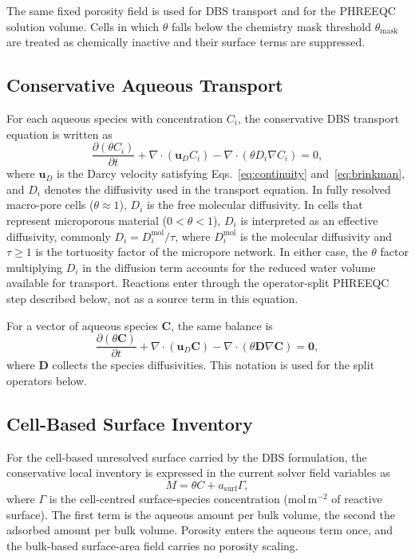 The same fixed porosity field is used for DBS transport and for the PHREEQC
solution volume. Cells in
which $\theta$ falls below the chemistry mask threshold
$\theta_{\mathrm{mask}}$ are treated as chemically inactive and their surface
terms are suppressed.

\subsection{Conservative Aqueous Transport}

For each aqueous species with concentration $C_i$, the conservative DBS
transport equation is written as
\begin{equation}
\frac{\partial (\theta C_i)}{\partial t}
+ \nabla \cdot (\bm{u}_D C_i)
- \nabla \cdot (\theta D_i \nabla C_i) = 0,
\end{equation}
where $\bm{u}_D$ is the Darcy velocity satisfying
Eqs.~\eqref{eq:continuity} and~\eqref{eq:brinkman}, and $D_i$ denotes the
diffusivity used in the transport equation. In fully resolved macro-pore cells
($\theta \approx 1$), $D_i$ is the free molecular diffusivity. In cells that
represent microporous material ($0 < \theta < 1$), $D_i$ is interpreted as an
effective diffusivity, commonly $D_i = D_i^{\mathrm{mol}}/\tau$, where
$D_i^{\mathrm{mol}}$ is the molecular diffusivity and $\tau \geq 1$ is the
tortuosity factor of the micropore network. In either case, the $\theta$ factor
multiplying $D_i$ in the diffusion term accounts for the reduced water volume
available for transport. Reactions enter through the operator-split PHREEQC
step described below, not as a source term in this equation.

For a vector of aqueous species $\bm{C}$, the same balance is
\begin{equation}
\frac{\partial (\theta \bm{C})}{\partial t}
+ \nabla \cdot (\bm{u}_D \bm{C})
- \nabla \cdot (\theta \bm{D} \nabla \bm{C}) = \bm{0},
\end{equation}
where $\bm{D}$ collects the species diffusivities. This notation is used for
the split operators below.

\subsection{Cell-Based Surface Inventory}

For the cell-based unresolved surface carried by the DBS formulation, the
conservative local inventory is expressed
in the current solver field variables as
\begin{equation}
M = \theta C + a_{\mathrm{surf}}\Gamma,
\label{eq:inventory}
\end{equation}
where $\Gamma$ is the cell-centred surface-species concentration
(mol\,m$^{-2}$ of reactive surface). The first term is the aqueous amount per
bulk volume, the second the adsorbed amount per bulk volume. Porosity enters
the aqueous term once, and the bulk-based surface-area field carries no
porosity scaling.

